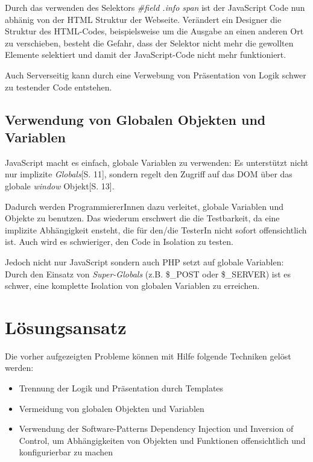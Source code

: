 \documentclass[a4paper,bibtotoc,oneside]{scrbook}
\begin{document}



Durch das verwenden des Selektors \emph{\#field .info span} ist der JavaScript Code nun abhänig von der HTML Struktur der Webseite. Verändert ein Designer  die Struktur des HTML-Codes, beispielsweise um die Ausgabe an einen anderen Ort zu verschieben, besteht die Gefahr, dass der Selektor nicht mehr die gewollten Elemente selektiert und damit der JavaScript-Code nicht mehr funktioniert.

Auch Serverseitig kann durch eine Verwebung von Präsentation von Logik schwer zu testender Code entstehen.

\subsection{Verwendung von Globalen Objekten und Variablen}
JavaScript macht es einfach, globale Variablen zu verwenden: Es unterstützt nicht nur implizite \emph{Globals}\cite{js_patterns}[S. 11], sondern regelt den Zugriff auf das DOM über das globale \emph{window} Objekt\cite{js_patterns}[S. 13].

Dadurch werden ProgrammiererInnen dazu verleitet, globale Variablen und Objekte zu benutzen. Das wiederum erschwert die die Testbarkeit, da eine implizite Abhängigkeit ensteht, die für den/die TesterIn nicht sofort offensichtlich ist. Auch wird es schwieriger, den Code in Isolation zu testen.

Jedoch nicht nur JavaScript sondern auch PHP setzt auf globale Variablen: Durch den Einsatz von \emph{Super-Globals} (z.B. \$\_POST oder \$\_SERVER) ist es schwer, eine komplette Isolation von globalen Variablen zu erreichen.

\section{Lösungsansatz}
Die vorher aufgezeigten Probleme können mit Hilfe folgende Techniken gelöst werden:

\begin{itemize}
	\item Trennung der Logik und Präsentation durch Templates
	\item Vermeidung von globalen Objekten und Variablen
	\item Verwendung der Software-Patterns Dependency Injection und Inversion of Control, um Abhängigkeiten von Objekten und Funktionen offensichtlich und konfigurierbar zu machen
\end{itemize}
\end{document}

